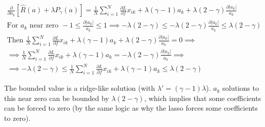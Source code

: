 \documentclass[11pt]{article}
\begin{document}
\begin{gather*}
\frac{\partial}{\partial a_{k}} [\hat{R}(a) + \lambda P_{\gamma}(a)] = 
\frac{1}{N} \sum_{i = 1}^{N} \frac{\partial L}{\partial f} x_{ik} + 
\lambda (\gamma - 1) a_{k} + 
\lambda (2 - \gamma) \frac{\partial |a_{k}|}{a_{k}}\\
\text{For } a_{k} \text{ near zero } 
-1 \le \frac{\partial |a_{k}|}{a_{k}} \le 1 \implies 
-\lambda (2 - \gamma) \le 
-\lambda (2 - \gamma) \frac{\partial |a_{k}|}{a_{k}} \le 
\lambda (2 - \gamma)\\
\text{Then } 
\frac{1}{N} \sum_{i = 1}^{N} \frac{\partial L}{\partial f} x_{ik} + 
\lambda (\gamma - 1) a_{k} + 
\lambda (2 - \gamma) \frac{\partial |a_{k}|}{a_{k}} = 0 \implies\\
\implies
\frac{1}{N} \sum_{i = 1}^{N} \frac{\partial L}{\partial f} x_{ik} + 
\lambda (\gamma - 1) a_{k} = 
- \lambda (2 - \gamma) \frac{\partial |a_{k}|}{a_{k}} \implies\\
\implies
-\lambda (2 - \gamma) \le 
\frac{1}{N} \sum_{i = 1}^{N} \frac{\partial L}{\partial f} x_{ik} + 
\lambda (\gamma - 1) a_{k} \le
\lambda (2 - \gamma)
\end{gather*}

\vspace{5mm}
\noindent
The bounded value is a ridge-like solution (with 
$\lambda ' = (\gamma - 1) \lambda$). $a_{k}$ solutions to this near zero can 
be bounded by $\lambda (2 - \gamma)$, which implies that some coefficients can 
be forced to zero (by the same logic as why the lasso forces some coefficients 
to zero).

\newpage
\begin{center}

\ \\
\end{center}
\end{document}
